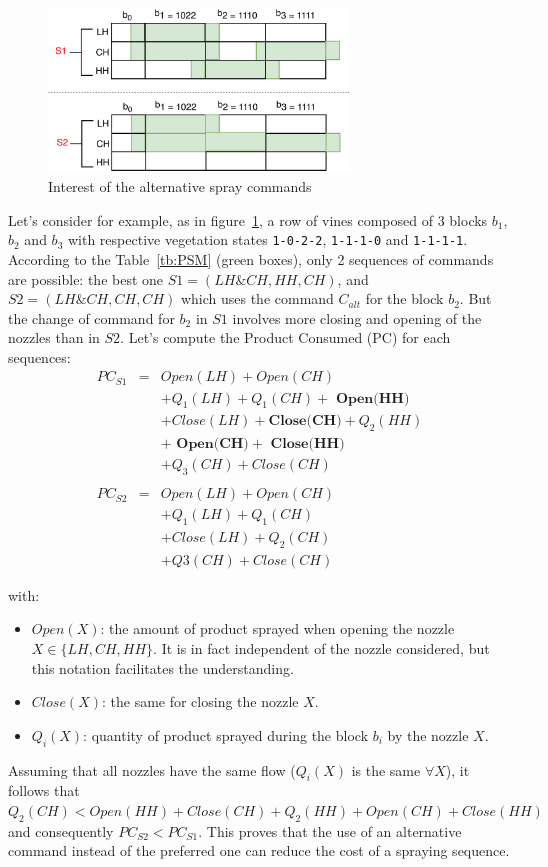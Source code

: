 \documentclass[preprint,3p,times,twocolumn]{elsarticle}
\begin{document}
\begin{figure}[h!]
\begin{center}
	\includegraphics[width=8cm]{Explication.pdf}
	\caption{Interest of the alternative spray commands} 
	\label{fig:CbestCalt}
\end{center}
\end{figure}

Let's consider for example, as in figure~\ref{fig:CbestCalt}, a row of vines composed of 3 blocks $ b_1 $, $ b_2 $ and $ b_3 $ with respective vegetation states \texttt{1-0-2-2}, \texttt{1-1-1-0} and \texttt{1-1-1-1}. According to the Table~\ref{tb:PSM} (green boxes), only 2 sequences of commands are possible: the best one $ S1= (LH \& CH, HH, CH) $, and $ S2=(LH \& CH, CH, CH)$ which uses the command $C_{alt}$ for the block $b_2$. 
But the change of command for $ b_2 $ in $S1$ involves more closing and opening of the nozzles than in $ S2 $. Let's compute the Product Consumed (PC) for each sequences:
\begin{eqnarray*}
PC_{S1} & = & Open(LH) + Open(CH) \\
&   & + Q_1(LH) + Q_1(CH) +\textbf{ Open(HH)} \\
&   & + Close(LH) + \textbf{Close(CH)} +  Q_2(HH) \\
&   &+\textbf{ Open(CH)} + \textbf{ Close(HH)}\\
&   & + Q_3(CH) + Close(CH) \\
& & \\
PC_{S2} & = & Open(LH) + Open(CH) \\
&   & + Q_1(LH) + Q_1(CH) \\
&   & + Close(LH) +  Q_2(CH) \\
&   & + Q3(CH) + Close(CH)
\end{eqnarray*}

with:
\begin{itemize}
\item $ Open (X) $: the amount of product sprayed when opening the nozzle $ X \in \{LH,CH,HH\}$. It is in fact independent of the nozzle considered, but this notation facilitates the understanding. 
\item $ Close (X) $: the same for closing the nozzle $ X $.
\item $ Q_i (X) $: quantity of product sprayed during the block $ b_i $ by the nozzle $ X $.
\end{itemize}
Assuming that all nozzles have the same flow ($Q_i(X)$ is the same $ \forall X$), it follows that $ Q_2(CH) < Open(HH) + Close(CH) + Q_2(HH) + Open(CH) + Close(HH) $ and consequently $PC_{S2}<PC_{S1}$. This proves that the use of an alternative command instead of the preferred one can reduce the cost of a spraying sequence.
\end{document}
